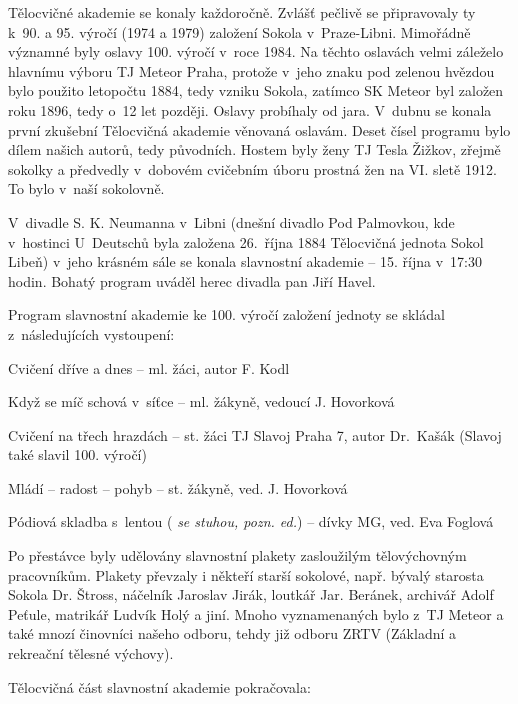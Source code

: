 \documentclass[a5paper, 11pt, twoside]{article}
\newcommand{\pozned}[1]{%
\textit{#1}}
\begin{document}
Tělocvičné akademie se konaly každoročně. Zvlášť pečlivě se připravovaly
ty k~90. a 95. výročí (1974 a 1979) založení Sokola v~Praze-Libni.
Mimořádně významné byly oslavy 100. výročí v~roce 1984. Na těchto
oslavách velmi záleželo hlavnímu výboru TJ Meteor Praha, protože v~jeho
znaku pod zelenou hvězdou bylo použito letopočtu 1884, tedy vzniku
Sokola, zatímco SK Meteor byl založen roku 1896, tedy o~12 let později.
Oslavy probíhaly od jara. V~dubnu se konala první zkušební Tělocvičná
akademie věnovaná oslavám. Deset čísel programu bylo dílem našich
autorů, tedy původních. Hostem byly ženy TJ Tesla Žižkov, zřejmě sokolky
a předvedly v~dobovém cvičebním úboru prostná žen na VI. sletě 1912. To
bylo v~naší sokolovně.

V~divadle S. K. Neumanna v~Libni (dnešní divadlo Pod Palmovkou, kde
v~hostinci U~Deutschů byla založena 26.~října 1884 Tělocvičná jednota
Sokol Libeň) v~jeho krásném sále se konala slavnostní akademie -- 15.
října v~17:30 hodin. Bohatý program uváděl herec divadla pan Jiří Havel.

Program slavnostní akademie ke 100. výročí založení jednoty se
skládal z~následujících vystoupení:
\smallskip

\noindent Cvičení dříve a dnes -- ml. žáci, autor F. Kodl

\noindent Když se míč schová v~síťce -- ml. žákyně, vedoucí J. Hovorková

\noindent Cvičení na třech hrazdách -- st. žáci TJ Slavoj Praha 7, autor Dr.~Kašák (Slavoj také slavil 100. výročí)

\noindent Mládí -- radost -- pohyb -- st. žákyně, ved. J. Hovorková


\noindent Pódiová skladba s~lentou (\pozned{se stuhou, pozn. ed.}) -- dívky MG, ved. Eva Foglová

\smallskip
Po přestávce byly udělovány slavnostní plakety zasloužilým tělovýchovným
pracovníkům. Plakety převzaly i někteří starší sokolové, např. bývalý
starosta Sokola Dr. Štross, náčelník Jaroslav Jirák, loutkář Jar.
Beránek, archivář Adolf Peťule, matrikář Ludvík Holý a jiní. Mnoho
vyznamenaných bylo z~TJ Meteor a také mnozí činovníci našeho odboru,
tehdy již odboru ZRTV (Základní a rekreační tělesné výchovy).

\smallskip
\noindent Tělocvičná část slavnostní akademie pokračovala:
\end{document}

